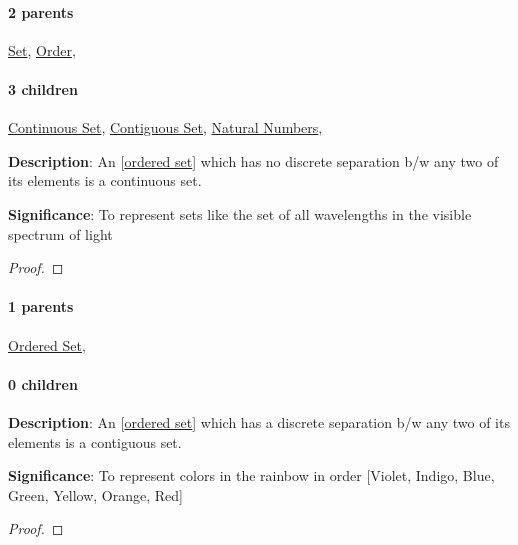 \documentclass[../main.tex]{subfiles}
\begin{document}
\paragraph{2 parents} \hyperref[statement:Set]{Set}, \hyperref[statement:Order]{Order}, 
\paragraph{3 children} \hyperref[statement:Continuous Set]{Continuous Set}, \hyperref[statement:Contiguous Set]{Contiguous Set}, \hyperref[statement:Natural Numbers]{Natural Numbers}, 



\begin{statement}
\label{statement:Continuous Set}\hspace*{0pt}\par
\end{statement}
\textbf{Description}:
An [\hyperref[statement:Ordered Set]{ordered set}] which has no discrete separation b/w any two of its elements is a continuous set.
\par
{\color{magenta} \textbf{Significance}:
To represent sets like the set of all wavelengths in the visible spectrum of light
\par}
\begin{proof}
\proofbydefinition
\end{proof}\par
\paragraph{1 parents} \hyperref[statement:Ordered Set]{Ordered Set}, 
\paragraph{0 children} 



\begin{statement}
\label{statement:Contiguous Set}\hspace*{0pt}\par
\end{statement}
\textbf{Description}:
An [\hyperref[statement:Ordered Set]{ordered set}] which has a discrete separation b/w any two of its elements is a contiguous set.
\par
{\color{magenta} \textbf{Significance}:
To represent colors in the rainbow in order [Violet, Indigo, Blue, Green, Yellow, Orange, Red]
\par}
\begin{proof}
\proofbydefinition
\end{proof}\par
\end{document}
